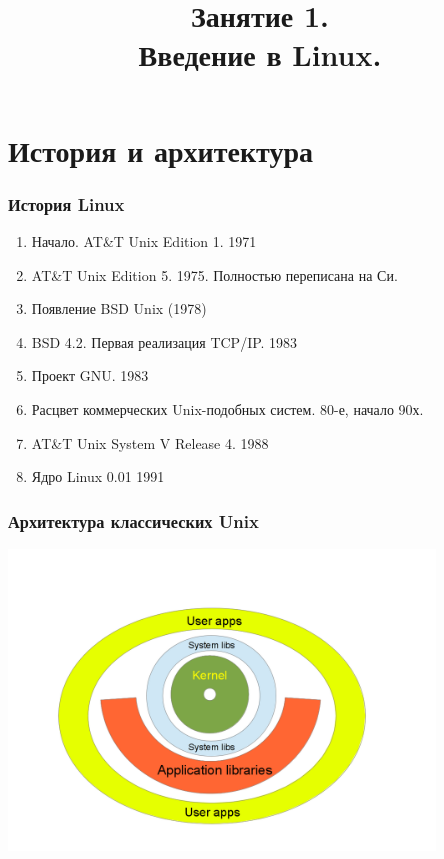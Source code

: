 

\title[SaM Solutions. Linux QA Training]
{
  Занятие 1.\\
  Введение в Linux.
}



\begin{frame}
  \titlepage
\end{frame}

\section{История и архитектура}

\begin{frame}
  \frametitle{История Linux}

  \begin{enumerate}
    \item Начало. AT\&T Unix Edition 1. 1971
    \item AT\&T Unix Edition 5. 1975. Полностью переписана на Си. 
    \item Появление BSD Unix (1978)
    \item BSD 4.2. Первая реализация TCP/IP. 1983
    \item Проект GNU. 1983 
    \item Расцвет коммерческих Unix-подобных систем. 80-е, начало 90х.
    \item AT\&T Unix System V Release 4. 1988
    \item Ядро Linux 0.01 1991 
  \end{enumerate}

\end{frame}

\begin{frame}
  \frametitle{Архитектура классических Unix}
    \includegraphics[height=8cm]{classic-unix-arch}
\end{frame}


